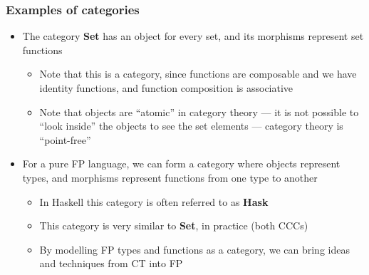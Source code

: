 \documentclass[mathserif,handout]{beamer}
\begin{document}
\begin{frame}[fragile]
  \frametitle{Examples of categories}
  \begin{itemize}
  \item The category \textbf{Set} has an object for every \alert{set}, and its morphisms represent set \alert{functions}
    \begin{itemize}
    \item Note that this is a category, since functions are composable and we have identity functions, and function composition is associative
      \item Note that objects are ``atomic'' in category theory --- it is not possible to ``look inside'' the objects to see the set elements --- category theory is ``point-free''
    \end{itemize}
  \item For a pure FP language, we can form a category where objects represent \alert{types}, and morphisms represent \alert{functions} from one type to another
    \begin{itemize}
      \item In Haskell this category is often referred to as \textbf{Hask}
    \item This category is very similar to \textbf{Set}, in practice (both CCCs)
    \item By modelling FP types and functions as a category, we can bring ideas and techniques from CT into FP
      \end{itemize}
  \end{itemize}
\end{frame}
\end{document}
